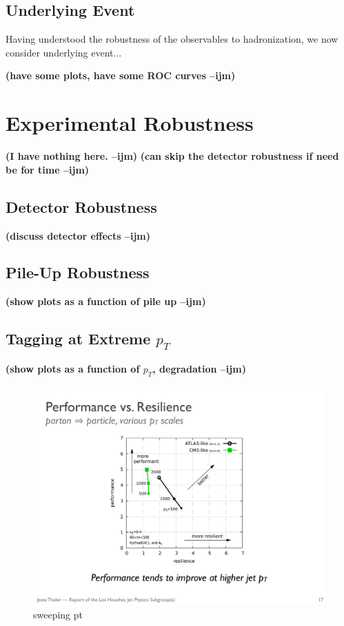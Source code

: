 \documentclass[11pt,letterpaper]{article}
\newcommand{\ijm}[1]{\textbf{\textcolor{llblue}{(#1 --ijm)}}}
\begin{document}
\subsection{Underlying Event}\label{sec:UE}

Having understood the robustness of the observables to hadronization, we now consider underlying event...

\ijm{have some plots, have some ROC curves}

\section{Experimental Robustness}\label{sec:exp}


\ijm{I have nothing here.}   \ijm{can skip the detector robustness if need be for time}

\subsection{Detector Robustness}\label{sec:detector_robust}

\ijm{discuss detector effects}

\subsection{Pile-Up Robustness}\label{sec:pu_robust}

\ijm{show plots as a function of pile up}

\subsection{Tagging at Extreme $p_T$}\label{sec:pt_robust}

\ijm{show plots as a function of $p_T$, degradation}

\begin{figure}
\begin{center}
\includegraphics[width=0.4\columnwidth]{figures/sweep_pt}
\end{center}
\caption{sweeping pt}
\label{fig:nolabel}
\end{figure}
\end{document}
